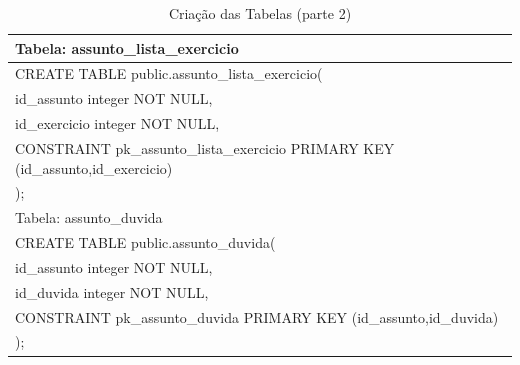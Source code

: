\documentclass[graduacao,brazil]{ThesisPUC}
\begin{document}
\begin{table}[H]
{\begin{tabular}{|l|}
    Tabela: assunto\_lista\_exercicio                                                                                                                                                                                                                                          \\ \hline
    CREATE TABLE public.assunto\_lista\_exercicio( \\	id\_assunto integer NOT NULL, \\	id\_exercicio integer NOT NULL, \\	CONSTRAINT pk\_assunto\_lista\_exercicio PRIMARY KEY (id\_assunto,id\_exercicio) \\);                                                                \\ \hline
    Tabela: assunto\_duvida                                                                                                                                                                                                                                                    \\ \hline
    CREATE TABLE public.assunto\_duvida( \\	id\_assunto integer NOT NULL, \\	id\_duvida integer NOT NULL, \\	CONSTRAINT pk\_assunto\_duvida PRIMARY KEY (id\_assunto,id\_duvida) \\);                                                                                          \\ \hline
    \end{tabular}
    }
    \caption {Cria\c{c}\~{a}o das Tabelas (parte 2)}
\end{table}

\end{document}
